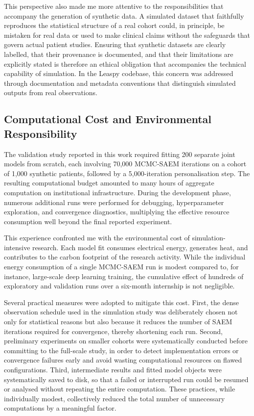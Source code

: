 \documentclass{rapportCS}
\begin{document}
This perspective also made me more attentive to the responsibilities that accompany the generation of synthetic data. A simulated dataset that faithfully reproduces the statistical structure of a real cohort could, in principle, be mistaken for real data or used to make clinical claims without the safeguards that govern actual patient studies. Ensuring that synthetic datasets are clearly labelled, that their provenance is documented, and that their limitations are explicitly stated is therefore an ethical obligation that accompanies the technical capability of simulation. In the Leaspy codebase, this concern was addressed through documentation and metadata conventions that distinguish simulated outputs from real observations.

\subsection{Computational Cost and Environmental Responsibility}

The validation study reported in this work required fitting 200 separate joint models from scratch, each involving 70,000 MCMC-SAEM iterations on a cohort of 1,000 synthetic patients, followed by a 5,000-iteration personalisation step. The resulting computational budget amounted to many hours of aggregate computation on institutional infrastructure. During the development phase, numerous additional runs were performed for debugging, hyperparameter exploration, and convergence diagnostics, multiplying the effective resource consumption well beyond the final reported experiment.

This experience confronted me with the environmental cost of simulation-intensive research. Each model fit consumes electrical energy, generates heat, and contributes to the carbon footprint of the research activity. While the individual energy consumption of a single MCMC-SAEM run is modest compared to, for instance, large-scale deep learning training, the cumulative effect of hundreds of exploratory and validation runs over a six-month internship is not negligible.

Several practical measures were adopted to mitigate this cost. First, the dense observation schedule used in the simulation study was deliberately chosen not only for statistical reasons but also because it reduces the number of SAEM iterations required for convergence, thereby shortening each run. Second, preliminary experiments on smaller cohorts were systematically conducted before committing to the full-scale study, in order to detect implementation errors or convergence failures early and avoid wasting computational resources on flawed configurations. Third, intermediate results and fitted model objects were systematically saved to disk, so that a failed or interrupted run could be resumed or analysed without repeating the entire computation. These practices, while individually modest, collectively reduced the total number of unnecessary computations by a meaningful factor.
\end{document}

